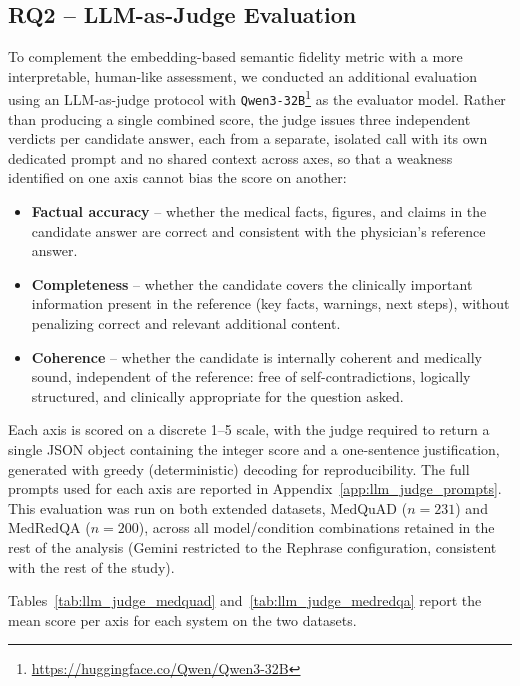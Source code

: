 \subsection{RQ2 -- LLM-as-Judge Evaluation}

To complement the embedding-based semantic fidelity metric with a more interpretable, human-like assessment, we conducted an additional evaluation using an LLM-as-judge protocol with \texttt{Qwen3-32B}\footnote{\url{https://huggingface.co/Qwen/Qwen3-32B}} \cite{qwen3technicalreport} as the evaluator model. Rather than producing a single combined score, the judge issues three independent verdicts per candidate answer, each from a separate, isolated call with its own dedicated prompt and no shared context across axes, so that a weakness identified on one axis cannot bias the score on another:

\begin{itemize}
    \item \textbf{Factual accuracy} -- whether the medical facts, figures, and claims in the candidate answer are correct and consistent with the physician's reference answer.
    \item \textbf{Completeness} -- whether the candidate covers the clinically important information present in the reference (key facts, warnings, next steps), without penalizing correct and relevant additional content.
    \item \textbf{Coherence} -- whether the candidate is internally coherent and medically sound, independent of the reference: free of self-contradictions, logically structured, and clinically appropriate for the question asked.
\end{itemize}

Each axis is scored on a discrete 1--5 scale, with the judge required to return a single JSON object containing the integer score and a one-sentence justification, generated with greedy (deterministic) decoding for reproducibility. The full prompts used for each axis are reported in Appendix~\ref{app:llm_judge_prompts}. This evaluation was run on both extended datasets, MedQuAD ($n=231$) and MedRedQA ($n=200$), across all model/condition combinations retained in the rest of the analysis (Gemini restricted to the Rephrase configuration, consistent with the rest of the study).

Tables~\ref{tab:llm_judge_medquad} and~\ref{tab:llm_judge_medredqa} report the mean score per axis for each system on the two datasets.

